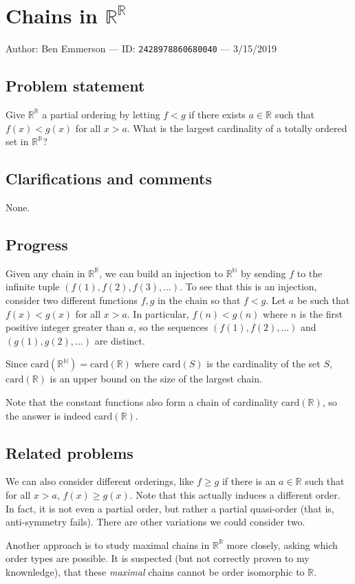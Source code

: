 
\section{Chains in $\mathbb{R}^\mathbb{R}$}

Author: Ben Emmerson --- ID: \verb`2428978860680040` --- 3/15/2019

\subsection{Problem statement}

Give $\mathbb{R}^\mathbb{R}$ a partial ordering by letting $f<g$ if there exists $a\in\mathbb{R}$ such that $f(x)<g(x)$ for all $x>a$. What is the largest cardinality of a totally ordered set in $\mathbb{R}^\mathbb{R}$?

\subsection{Clarifications and comments}

None.

\subsection{Progress}

Given any chain in $\mathbb{R}^\mathbb{R}$, we can build an injection to $\mathbb{R}^\mathbb{N}$ by sending $f$ to the infinite tuple $(f(1),f(2),f(3),\ldots)$. To see that this is an injection, consider two different functions $f,g$ in the chain so that $f<g$. Let $a$ be such that $f(x)<g(x)$ for all $x>a$. In particular, $f(n)<g(n)$ where $n$ is the first positive integer greater than $a$, so the sequences $(f(1),f(2),\ldots)$ and $(g(1),g(2),\ldots)$ are distinct.

Since $\textrm{card}(\mathbb{R}^\mathbb{N})=\textrm{card}(\mathbb{R})$ where $\textrm{card}(S)$ is the cardinality of the set $S$, $\textrm{card}(\mathbb{R})$ is an upper bound on the size of the largest chain.

 Note that the constant functions also form a chain of cardinality $\textrm{card}(\mathbb{R})$, so the answer is indeed $\textrm{card}(\mathbb{R})$.

\subsection{Related problems}

We can also consider different orderings, like $f\geq g$ if there is an $a\in\mathbb{R}$ such that for all $x>a$, $f(x)\geq g(x)$. Note that this actually induces a different order. In fact, it is not even a partial order, but rather a partial quasi-order (that is, anti-symmetry fails). There are other variations we could consider two.

Another approach is to study maximal chains in $\mathbb{R}^\mathbb{R}$ more closely, asking which order types are possible. It is suspected (but not correctly proven to my knownledge), that these \textit{maximal} chains cannot be order isomorphic to $\mathbb{R}$.

